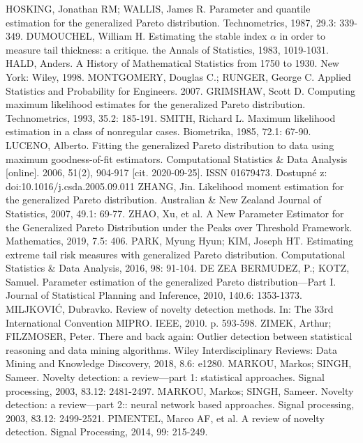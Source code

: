 \documentclass[11pt,twoside,openright]{report}
\begin{document}
\begin{thebibliography}{L}
HOSKING, Jonathan RM; WALLIS, James R. Parameter and quantile estimation for the generalized Pareto distribution. Technometrics, 1987, 29.3: 339-349.
DUMOUCHEL, William H. Estimating the stable index $\alpha$ in order to measure tail thickness: a critique. the Annals of Statistics, 1983, 1019-1031.
HALD, Anders. A History of Mathematical Statistics from 1750 to 1930. New York: Wiley, 1998.
MONTGOMERY, Douglas C.; RUNGER, George C. Applied Statistics and Probability for Engineers. 2007.
GRIMSHAW, Scott D. Computing maximum likelihood estimates for the generalized Pareto distribution. Technometrics, 1993, 35.2: 185-191.
SMITH, Richard L. Maximum likelihood estimation in a class of nonregular cases. Biometrika, 1985, 72.1: 67-90.
LUCENO, Alberto. Fitting the generalized Pareto distribution to data using maximum goodness-of-fit estimators. Computational Statistics \& Data Analysis [online]. 2006, 51(2), 904-917 [cit. 2020-09-25]. ISSN 01679473. Dostupné z: doi:10.1016/j.csda.2005.09.011
ZHANG, Jin. Likelihood moment estimation for the generalized Pareto distribution. Australian \& New Zealand Journal of Statistics, 2007, 49.1: 69-77.
ZHAO, Xu, et al. A New Parameter Estimator for the Generalized Pareto Distribution under the Peaks over Threshold Framework. Mathematics, 2019, 7.5: 406.
PARK, Myung Hyun; KIM, Joseph HT. Estimating extreme tail risk measures with generalized Pareto distribution. Computational Statistics \& Data Analysis, 2016, 98: 91-104.
DE ZEA BERMUDEZ, P.; KOTZ, Samuel. Parameter estimation of the generalized Pareto distribution—Part I. Journal of Statistical Planning and Inference, 2010, 140.6: 1353-1373.
MILJKOVIĆ, Dubravko. Review of novelty detection methods. In: The 33rd International Convention MIPRO. IEEE, 2010. p. 593-598.
ZIMEK, Arthur; FILZMOSER, Peter. There and back again: Outlier detection between statistical reasoning and data mining algorithms. Wiley Interdisciplinary Reviews: Data Mining and Knowledge Discovery, 2018, 8.6: e1280.
MARKOU, Markos; SINGH, Sameer. Novelty detection: a review—part 1: statistical approaches. Signal processing, 2003, 83.12: 2481-2497.
MARKOU, Markos; SINGH, Sameer. Novelty detection: a review—part 2:: neural network based approaches. Signal processing, 2003, 83.12: 2499-2521.
PIMENTEL, Marco AF, et al. A review of novelty detection. Signal Processing, 2014, 99: 215-249.

\end{thebibliography}
\end{document}

